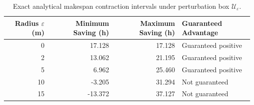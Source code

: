 \begin{table}[!htbp]
\centering
\caption{Exact analytical makespan contraction intervals under perturbation box $\mathcal{U}_\varepsilon$.}
\label{tab:robust_pair_uncertainty}
\renewcommand{\arraystretch}{1.15}
\small
\begin{tabularx}{\textwidth}{rrrX}
\toprule
\textbf{Radius $\varepsilon$ (m)} & \textbf{Minimum Saving (h)} & \textbf{Maximum Saving (h)} & \textbf{Guaranteed Advantage} \\
\midrule
0 & 17.128 & 17.128 & Guaranteed positive \\
2 & 13.062 & 21.195 & Guaranteed positive \\
5 & 6.962 & 25.460 & Guaranteed positive \\
10 & -3.205 & 31.294 & Not guaranteed \\
15 & -13.372 & 37.127 & Not guaranteed \\
\bottomrule
\end{tabularx}
\end{table}
